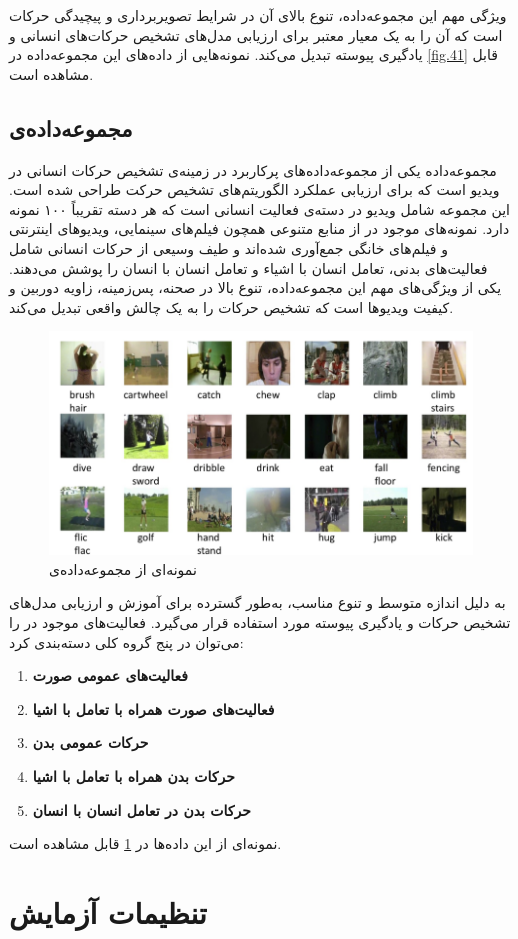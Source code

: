 ویژگی مهم این مجموعه‌داده، تنوع بالای آن در شرایط تصویربرداری و پیچیدگی حرکات است 
که آن را به یک معیار معتبر برای ارزیابی مدل‌های تشخیص حرکات‌های انسانی و یادگیری پیوسته تبدیل می‌کند. نمونه‌هایی از داده‌های این مجموعه‌داده در \cref{fig.41} قابل مشاهده است. 
‌\subsection{مجموعه‌داده‌ی }
مجموعه‌داده  \cite{hmdb51} یکی از مجموعه‌داده‌های پرکاربرد در زمینه‌ی تشخیص حرکات انسانی در ویدیو است که برای ارزیابی عملکرد الگوریتم‌های تشخیص حرکت طراحی شده است. 
این مجموعه شامل  ویدیو در  دسته‌ی فعالیت انسانی است که هر دسته تقریباً ۱۰۰ نمونه دارد. 
نمونه‌های موجود در  از منابع متنوعی همچون فیلم‌های سینمایی، ویدیو‌های اینترنتی و فیلم‌های خانگی جمع‌آوری شده‌اند 
و طیف وسیعی از حرکات انسانی شامل فعالیت‌های بدنی، تعامل انسان با اشیاء و تعامل انسان با انسان را پوشش می‌دهند. یکی از ویژگی‌های مهم این مجموعه‌داده، تنوع بالا در صحنه، پس‌زمینه، زاویه دوربین و کیفیت ویدیوها است 
که تشخیص حرکات را به یک چالش واقعی تبدیل می‌کند. 
\begin{figure}
	\centering\includegraphics[scale=.6]{Images/Chapter4/HMDB_snapshot1-300x225.png}
	\caption[]{ نمونه‌ای از مجموعه‌داده‌ی \cite{hmdb51}   }
	\label{fig.42}
\end{figure}
به دلیل اندازه متوسط و تنوع مناسب،  به‌طور گسترده برای آموزش و ارزیابی مدل‌های تشخیص حرکات و یادگیری پیوسته مورد استفاده قرار می‌گیرد. فعالیت‌های موجود در  را می‌توان در پنج گروه کلی دسته‌بندی کرد:
\begin{enumerate}
	\item \textbf{فعالیت‌های عمومی صورت}
	\item \textbf{فعالیت‌های صورت همراه با تعامل با اشیا} 
	\item \textbf{حرکات عمومی بدن} 
	\item \textbf{حرکات بدن همراه با تعامل با اشیا} 
	\item \textbf{حرکات بدن در تعامل انسان با انسان} 
\end{enumerate}
نمونه‌ای از این داده‌ها در \cref{fig.42} قابل مشاهده است.
\section{تنظیمات آزمایش}








